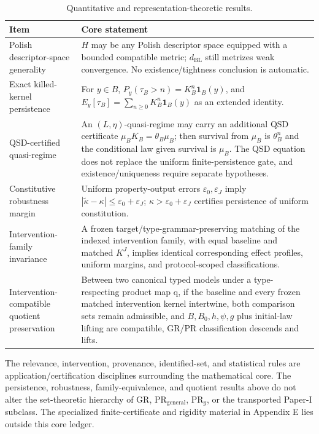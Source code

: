 \documentclass[10pt]{article}
\begin{document}
\begin{table}[htbp]
\centering
\footnotesize
\caption{Quantitative and representation-theoretic results.}
\label{tab:quant-ledger}
\begin{tabularx}{\textwidth}{@{}>{\raggedright\arraybackslash}p{}X@{}}
\toprule
\textbf{Item} & \textbf{Core statement}\\
\midrule
Polish descriptor-space generality & $H$ may be any Polish descriptor space equipped with a bounded compatible metric; $d_{\mathrm{BL}}$ still metrizes weak convergence. No existence/tightness conclusion is automatic.\\
Exact killed-kernel persistence & For $y\in B$, $P_y(\tau_B>n)=K_B^n\mathbf1_B(y)$, and $E_y[\tau_B]=\sum_{n\ge0}K_B^n\mathbf1_B(y)$ as an extended identity.\\
QSD-certified quasi-regime & An $(L,\eta)$-quasi-regime may carry an additional QSD certificate $\mu_BK_B=\theta_B\mu_B$; then survival from $\mu_B$ is $\theta_B^n$ and the conditional law given survival is $\mu_B$. The QSD equation does not replace the uniform finite-persistence gate, and existence/uniqueness require separate hypotheses.\\
Constitutive robustness margin & Uniform property-output errors $\varepsilon_0,\varepsilon_J$ imply $|\widetilde\kappa-\kappa|\le\varepsilon_0+\varepsilon_J$; $\kappa>\varepsilon_0+\varepsilon_J$ certifies persistence of uniform constitution.\\
Intervention-family invariance & A frozen target/type-grammar-preserving matching of the indexed intervention family, with equal baseline and matched $K^J$, implies identical corresponding effect profiles, uniform margins, and protocol-scoped classifications.\\
Intervention-compatible quotient preservation & Between two canonical typed models under a type-respecting product map q, if the baseline and every frozen matched intervention kernel intertwine, both comparison sets remain admissible, and $B,B_0,h,\psi,g$ plus initial-law lifting are compatible, GR/PR classification descends and lifts.\\
\bottomrule
\end{tabularx}
\end{table}

The relevance, intervention, provenance, identified-set, and statistical rules are application/certification disciplines surrounding the mathematical core. The persistence, robustness, family-equivalence, and quotient results above do not alter the set-theoretic hierarchy of GR, $\mathrm{PR}_{\mathrm{general}}$, $\mathrm{PR}_g$, or the transported Paper-I subclass. The specialized finite-certificate and rigidity material in Appendix E lies outside this core ledger.
\end{document}
